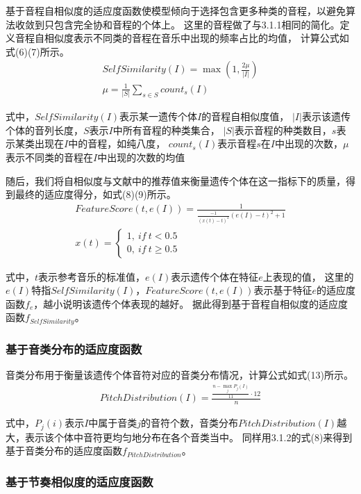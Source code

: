 \documentclass{article}
\begin{document}
基于音程自相似度的适应度函数使模型倾向于选择包含更多种类的音程，以避免算法收敛到只包含完全协和音程的个体上。
这里的音程做了与3.1.1相同的简化。定义音程自相似度表示不同类的音程在音乐中出现的频率占比的均值，
计算公式如式(6)(7)所示。
\begin{gather}
    SelfSimilarity(I)=\max(1, \frac{2\mu}{|I|})\\
    \mu=\frac{1}{|S|}\sum_{s\in S} count_s(I)
\end{gather}

式中，$SelfSimilarity(I)$表示某一遗传个体$I$的音程自相似度值，
$|I|$表示该遗传个体的音列长度，$S$表示$I$中所有音程的种类集合，
$|S|$表示音程的种类数目，$s$表示某类出现在$I$中的音程，如纯八度，
$count_s(I)$表示音程$s$在$I$中出现的次数，$\mu$表示不同类的音程在$I$中出现的次数的均值

随后，我们将自相似度与文献中的推荐值来衡量遗传个体在这一指标下的质量，得到最终的适应度得分，如式(8)(9)所示。
\begin{gather}
    FeatureScore(t,e(I))=\frac{1}{\frac{-1}{(x(t)-t)^2}(e(I)-t)^2+1}\\
    x(t)=\left\{\begin{matrix}
        1,\ if\ t<0.5\\ 
        0,\ if\ t\geq 0.5
        \end{matrix}\right.
\end{gather}

式中，$t$表示参考音乐的标准值，$e(I)$表示遗传个体在特征$e$上表现的值，
这里的$e(I)$特指$SelfSimilarity(I)$，$FeatureScore(t,e(I))$表示基于特征$e$的适应度函数$f_e$，越小说明该遗传个体表现的越好。
据此得到基于音程自相似度的适应度函数$f_{SelfSimilarity}$。

\subsubsection{基于音类分布的适应度函数}

音类分布用于衡量该遗传个体音符对应的音类分布情况，计算公式如式(13)所示。
\begin{gather}
    PitchDistribution(I)=\frac{\frac{n-\max_j P_j(I)}{11}\cdot 12}{n}
\end{gather}

式中，$P_j(i)$表示$I$中属于音类$j$的音符个数，音类分布$PitchDistribution(I)$越大，表示该个体中音符更均匀地分布在各个音类当中。
同样用3.1.2的式(8)来得到基于音类分布的适应度函数$f_{PitchDistribution}$。

\subsubsection{基于节奏相似度的适应度函数}
\end{document}
